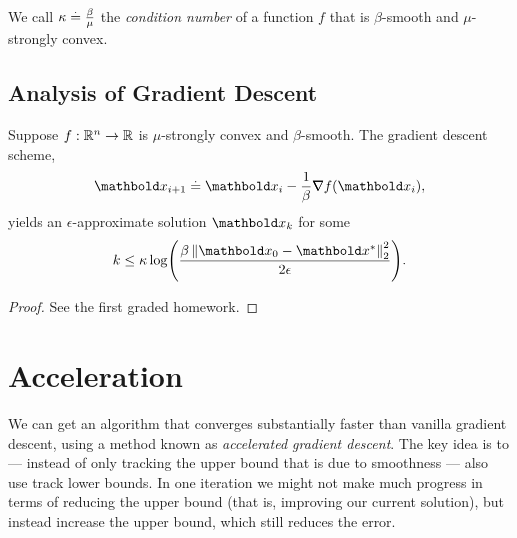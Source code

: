 \begin{defn} We call $\kappa \overset{.}{=} \frac{\beta}{\mu}$ the \emph{condition number} of a function $f$ that is $\beta$-smooth and $\mu$-strongly convex.
\end{defn}

\subsection{Analysis of Gradient Descent}

\begin{thm} Suppose $f: \mathbb{R}^n \to \mathbb{R}$ is $\mu$-strongly convex and $\beta$-smooth. The gradient descent scheme, \begin{align}
    \vx_{i+1} \defeq \vx_i - \frac{1}{\beta}\grad f(\vx_i),
\end{align} yields an $\epsilon$-approximate solution $\vx_k$ for some \begin{align*}
    k \leq \kappa\log\parentheses*{\frac{\beta\norm{\vx_0 - \s{\vx}}_2^2}{2\epsilon}}.
\end{align*}
\end{thm}
\begin{proof}
See the first graded homework.
\end{proof}

\section{Acceleration}

We can get an algorithm that converges substantially faster than vanilla gradient descent, using a method known as \emph{accelerated gradient descent}. The key idea is to --- instead of only tracking the upper bound that is due to smoothness --- also use track lower bounds. In one iteration we might not make much progress in terms of reducing the upper bound (that is, improving our current solution), but instead increase the upper bound, which still reduces the error.

